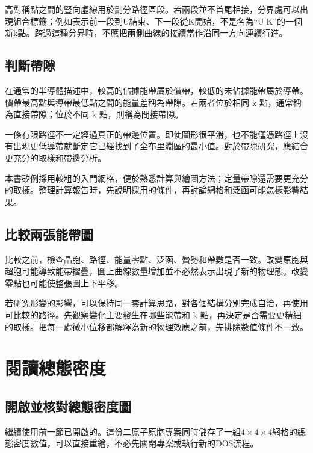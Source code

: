 高對稱點之間的豎向虛線用於劃分路徑區段。若兩段並不首尾相接，分界處可以出現組合標籤；例如表示前一段到U結束、下一段從K開始，不是名為“U|K”的一個新k點。跨過這種分界時，不應把兩側曲線的接續當作沿同一方向連續行進。

\subsection{判斷帶隙}

在通常的半導體描述中，較高的佔據能帶屬於價帶，較低的未佔據能帶屬於導帶。價帶最高點與導帶最低點之間的能量差稱為帶隙。若兩者位於相同 k 點，通常稱為直接帶隙；位於不同 k 點，則稱為間接帶隙。

一條有限路徑不一定經過真正的帶邊位置。即使圖形很平滑，也不能僅憑路徑上沒有出現更低導帶就斷定它已經找到了全布里淵區的最小值。對於帶隙研究，應結合更充分的取樣和帶邊分析。

本書矽例採用較粗的入門網格，便於熟悉計算與繪圖方法；定量帶隙還需要更充分的取樣。整理計算報告時，先說明採用的條件，再討論網格和泛函可能怎樣影響結果。

\subsection{比較兩張能帶圖}

比較之前，檢查晶胞、路徑、能量零點、泛函、贗勢和帶數是否一致。改變原胞與超胞可能導致能帶摺疊，圖上曲線數量增加並不必然表示出現了新的物理態。改變零點也可能使整張圖上下平移。

若研究形變的影響，可以保持同一套計算思路，對各個結構分別完成自洽，再使用可比較的路徑。先觀察變化主要發生在哪些能帶和 k 點，再決定是否需要更精細的取樣。把每一處微小位移都解釋為新的物理效應之前，先排除數值條件不一致。

\section{閱讀總態密度}

\subsection{開啟並核對總態密度圖}

繼續使用前一節已開啟的。這份二原子原胞專案同時儲存了一組$4\times4\times4$網格的總態密度數值，可以直接重繪，不必先關閉專案或執行新的DOS流程。

